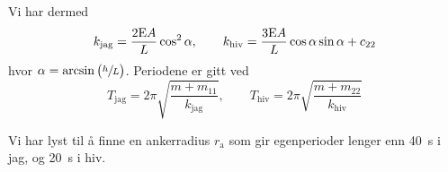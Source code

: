 Vi har dermed
\[
k_{\mathrm{jag}} = \frac{2\mathrm{E} A}{L}\cos^{2}{\alpha}, \qquad k_{\mathrm{hiv}} = \frac{3\mathrm{E} A}{L}\cos{\alpha}\sin{\alpha} + c_{22}
\]
hvor $\alpha = \arcsin{\big( \sfrac{h}{L} \big)}$.
Periodene er gitt ved
\[
T_{\mathrm{jag}} = 2\pi\sqrt{\frac{m + m_{11}}{k_{\mathrm{jag}}}}, \qquad T_{\mathrm{hiv}} = 2\pi\sqrt{\frac{m + m_{22}}{k_{\mathrm{hiv}}}}
\]

\vspace{2em}
Vi har lyst til å finne en ankerradius $r_{\mathrm{a}}$ som gir egenperioder lenger enn \SI{40}{\second} i jag, og \SI{20}{\second} i hiv.
